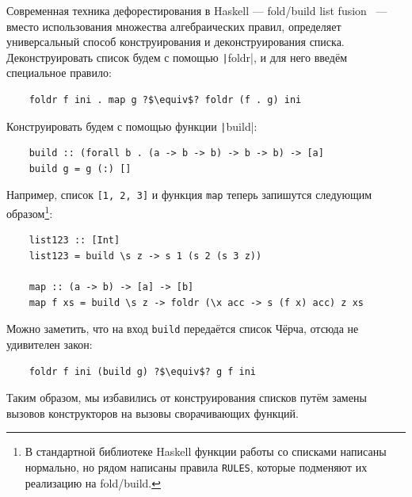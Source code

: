 Современная техника дефорестирования в Haskell --- fold/build list fusion~\cite{gill1993short} --- вместо использования множества алгебраических правил, определяет универсальный способ конструирования и деконструирования списка.
Деконструировать список будем с помощью \texttt|foldr|, и для него введём специальное правило:
\begin{verbatim}
    foldr f ini . map g ?$\equiv$? foldr (f . g) ini
\end{verbatim}
Конструировать будем с помощью функции \texttt|build|:
\begin{verbatim}
    build :: (forall b . (a -> b -> b) -> b -> b) -> [a]
    build g = g (:) []
\end{verbatim}
Например, список \texttt{[1, 2, 3]} и функция \texttt{map} теперь запишутся следующим образом\footnote{В стандартной библиотеке Haskell функции работы со списками написаны нормально, но рядом написаны правила \texttt{RULES}, которые подменяют их реализацию на fold/build.}:
\begin{verbatim}
    list123 :: [Int]
    list123 = build \s z -> s 1 (s 2 (s 3 z))

    map :: (a -> b) -> [a] -> [b]
    map f xs = build \s z -> foldr (\x acc -> s (f x) acc) z xs
\end{verbatim}
Можно заметить, что на вход \texttt{build} передаётся список Чёрча, отсюда не удивителен закон:
\begin{verbatim}
    foldr f ini (build g) ?$\equiv$? g f ini
\end{verbatim}

Таким образом, мы избавились от конструирования списков путём замены вызовов конструкторов на вызовы сворачивающих функций.

